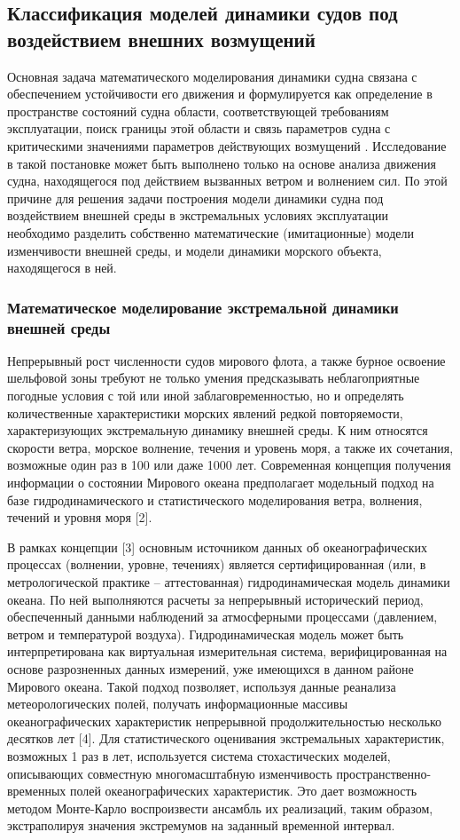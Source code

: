 \subsection{Классификация моделей динамики судов под воздействием внешних возмущений}
Основная задача математического моделирования динамики судна связана с обеспечением устойчивости его движения и формулируется как определение в пространстве состояний судна области, соответствующей требованиям эксплуатации, поиск границы этой области и связь параметров судна с критическими значениями параметров действующих возмущений \cite{dk1}. Исследование в такой постановке может быть выполнено только на основе анализа движения судна, находящегося под действием вызванных ветром и волнением сил. По этой причине для решения задачи построения модели динамики судна под воздействием внешней среды в экстремальных условиях эксплуатации необходимо разделить собственно математические (имитационные) модели изменчивости внешней среды, и модели динамики морского объекта, находящегося в ней.

\subsubsection{Математическое моделирование экстремальной динамики внешней среды}
Непрерывный рост численности судов мирового флота, а также бурное освоение шельфовой зоны требуют не только умения предсказывать неблагоприятные погодные условия с той или иной заблаговременностью, но и определять количественные характеристики морских явлений редкой повторяемости, характеризующих экстремальную динамику внешней среды. К ним относятся скорости ветра, морское волнение, течения и уровень моря, а также их сочетания, возможные один раз в 100 или даже 1000 лет. Современная концепция получения информации о состоянии Мирового океана предполагает модельный подход на базе гидродинамического и статистического моделирования ветра, волнения, течений и уровня моря [2].

В рамках концепции [3] основным источником данных об океанографических процессах (волнении, уровне, течениях) является сертифицированная (или, в метрологической практике – аттестованная) гидродинамическая модель динамики океана. По ней выполняются расчеты за непрерывный исторический период, обеспеченный данными наблюдений за атмосферными процессами (давлением, ветром и температурой воздуха). Гидродинамическая модель может быть интерпретирована как виртуальная измерительная система, верифицированная на основе разрозненных данных измерений, уже имеющихся в данном районе Мирового океана. Такой подход позволяет, используя данные реанализа метеорологических полей, получать информационные массивы океанографических характеристик непрерывной продолжительностью несколько десятков лет [4]. Для статистического оценивания экстремальных характеристик, возможных 1 раз в   лет, используется система стохастических моделей, описывающих совместную многомасштабную изменчивость пространственно-временных полей океанографических характеристик. Это дает возможность методом Монте-Карло воспроизвести ансамбль их реализаций, таким образом, экстраполируя значения экстремумов на заданный временной интервал.

